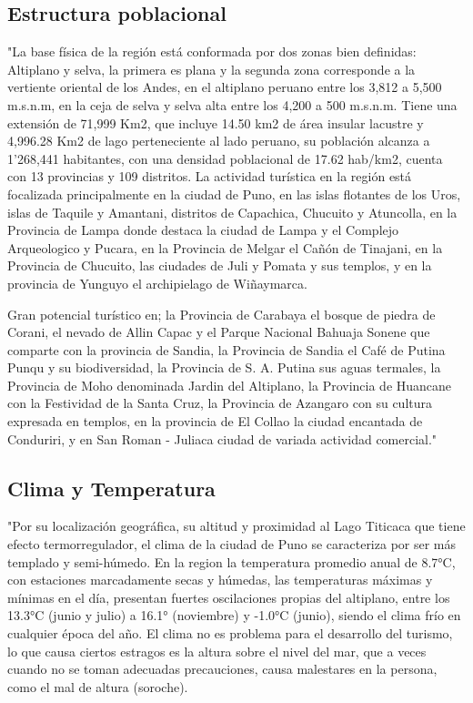 \subsection{Estructura poblacional}
"La base física de la región está conformada por dos zonas bien definidas: Altiplano y selva, la primera es plana y la segunda zona corresponde a la vertiente oriental de los Andes, en el altiplano peruano entre los 3,812 a 5,500 m.s.n.m, en la ceja de selva y selva alta entre los 4,200 a 500 m.s.n.m. Tiene una extensión de 71,999 Km2, que incluye 14.50 km2 de área insular lacustre y 4,996.28 Km2 de lago perteneciente al lado peruano, su población alcanza a 1’268,441 habitantes, con una densidad poblacional de 17.62 hab/km2, cuenta con 13 provincias y 109 distritos.
La actividad turística en la región está focalizada principalmente en la ciudad de Puno, en las islas flotantes de los Uros, islas de Taquile y Amantani, distritos de Capachica, Chucuito y Atuncolla, en la Provincia de Lampa donde destaca la ciudad de Lampa y el Complejo Arqueologico y Pucara, en la Provincia de Melgar el Cañón de Tinajani, en la Provincia de Chucuito, las ciudades de Juli y Pomata y sus templos, y en la provincia de Yunguyo el archipielago de Wiñaymarca.

Gran potencial turístico en; la Provincia de Carabaya el bosque de piedra de Corani, el nevado de Allin Capac y el Parque Nacional Bahuaja Sonene que comparte con la provincia de Sandia, la Provincia de Sandia el Café de Putina Punqu y su biodiversidad, la Provincia de S. A. Putina sus aguas termales, la Provincia de Moho denominada Jardin del Altiplano, la Provincia de Huancane con la Festividad de la Santa Cruz, la Provincia de Azangaro con su cultura expresada en templos, en la provincia de El Collao la ciudad encantada de Conduriri, y en San Roman - Juliaca ciudad de variada actividad comercial." \cite{2011PlanPERTUR}
\subsection{Clima y Temperatura}
"Por su localización geográfica, su altitud y proximidad al Lago Titicaca que tiene efecto termorregulador, el clima de la ciudad de Puno se caracteriza por ser más templado y semi-húmedo. En la region la temperatura promedio anual de 8.7°C, con estaciones marcadamente secas y húmedas, las temperaturas máximas y mínimas en el día, presentan fuertes oscilaciones propias del altiplano, entre los 13.3°C (junio y julio) a 16.1° (noviembre) y -1.0°C (junio), siendo el clima frío en cualquier época del año. El clima no es problema para el desarrollo del turismo, lo que causa ciertos estragos es la altura sobre el nivel del mar, que a veces cuando no se toman adecuadas precauciones, causa malestares en la persona, como el mal de altura (soroche).

